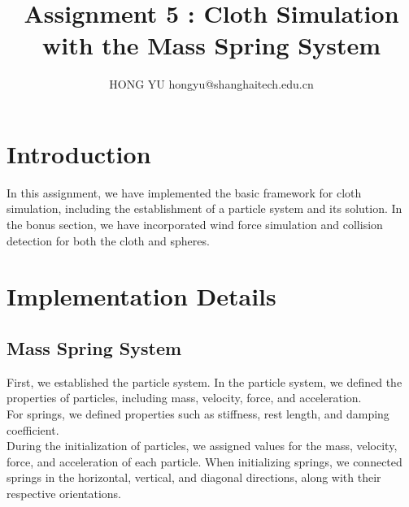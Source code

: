 \documentclass[acmtog]{acmart}
\title{Assignment 5 : Cloth Simulation with the Mass Spring System}
\author{HONG YU \quad 2021533148 \quad hongyu@shanghaitech.edu.cn}
\begin{document}
\maketitle

\vspace*{2 ex}


\section{Introduction}

In this assignment, we have implemented the basic framework for cloth simulation, including the establishment of a particle system and its solution. In the bonus section, we have incorporated wind force simulation and collision detection for both the cloth and spheres.

\section{Implementation Details}

\subsection{Mass Spring System}
First, we established the particle system. In the particle system, we defined the properties of particles, including mass, velocity, force, and acceleration.\\
For springs, we defined properties such as stiffness, rest length, and damping coefficient.\\
During the initialization of particles, we assigned values for the mass, velocity, force, and acceleration of each particle. When initializing springs, we connected springs in the horizontal, vertical, and diagonal directions, along with their respective orientations.
\end{document}
